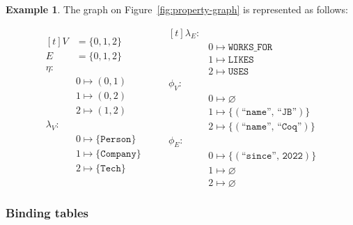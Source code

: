 \documentclass[14pt]{constructor-thesis}
\theoremstyle{definition}
\newtheorem{example}{Example}
\begin{document}
\begin{example}
  The graph on Figure~\ref{fig:property-graph} is represented as follows:

  \begin{equation*}
    \begin{aligned}[t]
      V &= \{0, 1, 2 \} \\
      E &= \{0, 1, 2 \} \\
      \eta: & \\
            & 0 \mapsto (0, 1) \\
            & 1 \mapsto (0, 2) \\
            & 2 \mapsto (1, 2) \\
      \lambda_V: & \\
            & 0 \mapsto \{\texttt{Person}\} \\
            & 1 \mapsto \{\texttt{Company}\} \\
            & 2 \mapsto \{\texttt{Tech}\} \\
    \end{aligned}
    \qquad
    \begin{aligned}[t]
      \lambda_E: & \\
            & 0 \mapsto \texttt{WORKS\_FOR} \\
            & 1 \mapsto \texttt{LIKES} \\
            & 2 \mapsto \texttt{USES} \\
      \phi_V: & \\
            & 0 \mapsto \varnothing \\
            & 1 \mapsto \{(\texttt{``name''}, \, \texttt{``JB''})\} \\
            & 2 \mapsto \{(\texttt{``name''}, \, \texttt{``Coq''})\} \\
      \phi_E: & \\
            & 0 \mapsto \{(\texttt{``since''}, \, \texttt{2022})\} \\
            & 1 \mapsto  \varnothing \\
            & 2 \mapsto \varnothing
    \end{aligned}
  \end{equation*}

  \label{ex:graph-formally}
\end{example}

\subsubsection{Binding tables}
\end{document}
